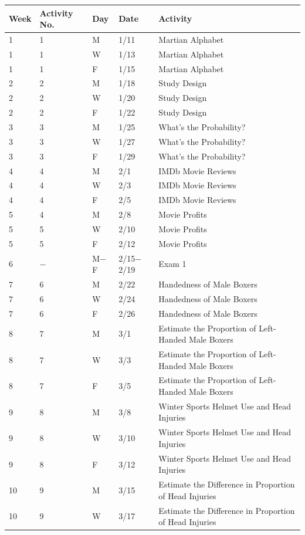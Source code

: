 \documentclass[
]{report}
\begin{document}
\begin{longtable}{|p{}|l|p{}|l|p{}|}
\hline
\textbf{Week}& \textbf{Activity No.}& \textbf{Day}& \textbf{Date}& \textbf{Activity} \\ \hline
\endhead
1& 1& M& 1/11& Martian Alphabet \\*
1& 1& W& 1/13& Martian Alphabet \\*
1& 1& F& 1/15& Martian Alphabet \\ \hline
2& 2& M& 1/18& Study Design \\*
2& 2& W& 1/20& Study Design \\*
2& 2& F& 1/22& Study Design \\ \hline
3& 3& M& 1/25& What's the Probability? \\*
3& 3& W& 1/27& What's the Probability? \\*
3& 3& F& 1/29& What's the Probability? \\ \hline
4& 4& M& 2/1& IMDb Movie Reviews \\*
4& 4& W& 2/3& IMDb Movie Reviews \\*
4& 4& F& 2/5& IMDb Movie Reviews \\ \hline
5& 4& M& 2/8& Movie Profits \\*
5& 5& W& 2/10& Movie Profits \\*	
5& 5& F& 2/12& Movie Profits \\ \hline
6& $-$& M$-$F& 2/15$-$2/19& Exam 1 \\ \hline
7& 6& M& 2/22& Handedness of Male Boxers \\*
7& 6& W& 2/24& Handedness of Male Boxers \\*	
7& 6& F& 2/26& Handedness of Male Boxers \\ \hline
8& 7& M& 3/1& Estimate the Proportion of Left-Handed Male Boxers \\*
8& 7& W& 3/3& Estimate the Proportion of Left-Handed Male Boxers \\*	
8& 7& F& 3/5& Estimate the Proportion of Left-Handed Male Boxers \\ \hline
9& 8& M& 3/8& Winter Sports Helmet Use and Head Injuries \\*
9& 8& W& 3/10& Winter Sports Helmet Use and Head Injuries \\*	
9& 8& F& 3/12& Winter Sports Helmet Use and Head Injuries \\ \hline
10& 9& M& 3/15& Estimate the Difference in Proportion of Head Injuries \\*
10& 9& W& 3/17& Estimate the Difference in Proportion of Head Injuries \\*

\end{longtable}
\end{document}
